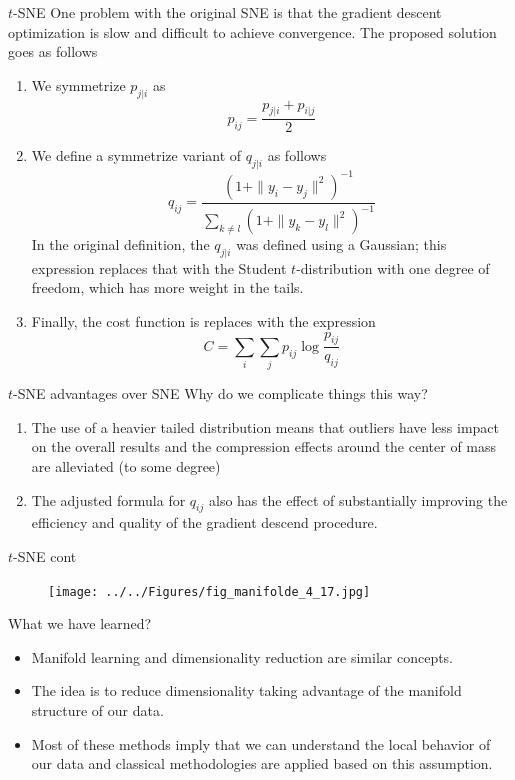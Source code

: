 \documentclass{beamer}
\begin{document}
\begin{frame}{$t$-SNE}
	One problem with the original SNE is that the gradient descent optimization is slow and difficult to achieve convergence. The proposed solution goes as follows
	\begin{enumerate}
		\item We symmetrize $p_{j|i}$ as 
		\begin{equation*}
			p_{ij}= \frac{p_{j|i}+p_{i|j}}{2}
		\end{equation*}
	\item We define a symmetrize variant of $q_{j|i}$ as follows
	\begin{equation*}
		q_{ij}= \frac{(1+\|y_i-y_j\|^2)^{-1}}{\sum_{k\ne l}(1+\|y_k-y_l\|^2)^{-1}}
	\end{equation*}
	In the original definition, the $q_{j|i}$ was defined using a Gaussian; this expression replaces that with the Student $t$-distribution with one degree of freedom, which has more weight in the tails.
	\item Finally, the cost function is replaces with the expression
	\begin{equation*}
		C= \sum_i \sum_j p_{ij} \log \frac{p_{ij}}{q_{ij}}
	\end{equation*}
	\end{enumerate}
\end{frame}

\begin{frame}{$t$-SNE advantages over SNE}
	Why do we complicate things this way?
	\begin{enumerate}
		\item The use of a heavier tailed distribution means that outliers have less impact on the overall results and the compression effects around the center of mass are alleviated (to some degree)
		\item The adjusted formula for $q_{ij}$ also has the effect of substantially improving the efficiency and quality of the gradient descend procedure.
	\end{enumerate}
\end{frame}

\begin{frame}{$t$-SNE cont}
	\begin{figure}[h]
		\centering
		\texttt{[image: ../../Figures/fig\_manifolde\_4\_17.jpg]}
	\end{figure}				
	
\end{frame}


\begin{frame}{What we have learned?	}
	\begin{itemize}
		\item Manifold learning and dimensionality reduction are similar concepts.
		\item The idea is to reduce dimensionality taking advantage of the manifold structure of our data. 
		\item Most of these methods imply that we can understand the local behavior of our data and classical methodologies are applied based on this assumption.
	\end{itemize}
\end{frame}
\end{document}
